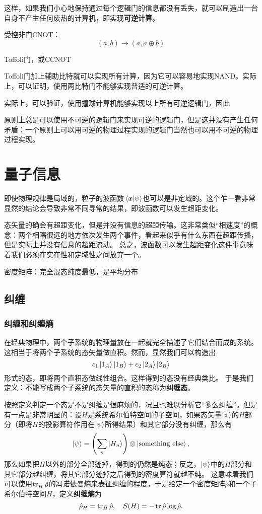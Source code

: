 \documentclass[UTF8, a4paper]{ctexart}
\begin{document}
这样，如果我们小心地保持通过每个逻辑门的信息都没有丢失，就可以制造出一台自身不产生任何废热的计算机，即实现\textbf{可逆计算}。

受控非门CNOT：
\[
    (a, b) \longrightarrow (a, a \oplus b)
\]

Toffoli门，或CCNOT

Toffoli门加上辅助比特就可以实现所有计算，因为它可以容易地实现NAND。实际上，可以证明，使用两比特门不能够实现普适的可逆计算。

实际上，可以验证，使用撞球计算机能够实现以上所有可逆逻辑门，因此

原则上总是可以使用不可逆的逻辑门来实现可逆的逻辑门，但是这并没有产生任何矛盾：一个原则上可以用可逆的物理过程实现的逻辑门当然也可以用不可逆的物理过程实现。

\section{量子信息}

即使物理规律是局域的，粒子的波函数$\braket*{\vb*{x}}{\psi}$也可以是非定域的。这个乍一看非常显然的结论会导致非常不同寻常的结果，即波函数可以发生超距变化。

态矢量的确会有超距变化，但是并没有信息的超距传输。这非常类似“相速度”的概念：两个相隔很远的地方依次发生两个事件，看起来似乎有什么东西在超距传播，但是实际上并没有信息的超距流动。
总之，波函数可以发生超距变化这件事意味着我们必须在实在性和定域性之间放弃一个。%

密度矩阵：完全混态纯度最低，是平均分布

\subsection{纠缠}

\subsubsection{纠缠和纠缠熵}

在经典物理中，两个子系统的物理量放在一起就完全描述了它们结合而成的系统。
这相当于将两个子系统的态矢量做直积。然而，显然我们可以构造出
\[
    c_1 \ket{1_A} \ket{1_B} + c_2 \ket{2_A} \ket{2_B}
\]
形式的态，即将两个直积态做线性组合。这样得到的态没有经典类比。
于是我们定义：不能写成两个子系统的态矢量的直积的态称为\textbf{纠缠态}。

按照定义判定一个态是不是纠缠是很麻烦的，况且也难以分析它“多么纠缠”。但是有一点是非常明显的：设$H$是系统希尔伯特空间的子空间，如果态矢量$\ket{\psi}$的$H$部分（即将$H$的投影算符作用在$\ket{\psi}$所得结果）和其它部分没有纠缠，那么有
\[
    \ket{\psi} = \left( \sum_{n} \ket{H_n} \right) \otimes \ket{\text{something else}},
\]
那么如果把$H$以外的部分全部迹掉，得到的仍然是纯态；反之，$\ket{\psi}$中的$H$部分和其它部分越纠缠，将其它部分迹掉之后得到的密度算符就越不纯。
这意味着我们可以使用$\trace_{\bar{H}} \hat{\rho}$的冯诺依曼熵来表征纠缠的程度，于是给定一个密度矩阵$\hat{\rho}$和一个子希尔伯特空间$H$，定义\textbf{纠缠熵}为
\begin{equation}
    \hat{\rho}_H = \trace_{\bar{H}} \hat{\rho}, \quad S(H) = - \trace \hat{\rho} \log \hat{\rho}.
\end{equation}
\end{document}
